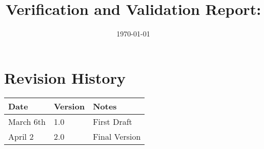 \documentclass[12pt, titlepage]{article}
\begin{document}
\title{Verification and Validation Report: \progname} 
\author{\authname}
\date{\today}
	
\maketitle


\section{Revision History}

\begin{tabularx}{\textwidth}{p{3cm}p{2cm}X}
\toprule {\bf Date} & {\bf Version} & {\bf Notes}\\
\midrule
March 6th & 1.0 & First Draft\\
\hline
April 2 & 2.0 & Final Version \\
\bottomrule
\end{tabularx}

~\newpage
\end{document}
